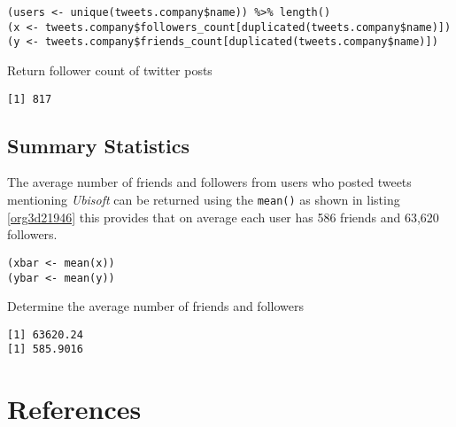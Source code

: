 \documentclass[11pt]{article}
\begin{document}
\begin{listing}[htbp]
\begin{verbatim}
(users <- unique(tweets.company$name)) %>% length()
(x <- tweets.company$followers_count[duplicated(tweets.company$name)])
(y <- tweets.company$friends_count[duplicated(tweets.company$name)])
\end{verbatim}
\caption{\label{orgf539ac4}Return follower count of twitter posts}
\end{listing}

\begin{verbatim}
[1] 817
\end{verbatim}

\subsection{Summary Statistics}
\label{sec:org112b28c}
The average number of friends and followers from users who posted tweets mentioning \emph{Ubisoft} can be returned using the \texttt{mean()} as shown in listing \ref{org3d21946}
this provides that on average each user has 586 friends and 63,620 followers.

\begin{listing}[htbp]
\begin{verbatim}
(xbar <- mean(x))
(ybar <- mean(y))
\end{verbatim}
\caption{\label{org3d21946}Determine the average number of friends and followers}
\end{listing}

\begin{verbatim}
[1] 63620.24
[1] 585.9016
\end{verbatim}


\section{References}
\label{sec:org36d7de7}
\label{orgcf43adb}


\label{org56cf1a8}
 
\end{document}
